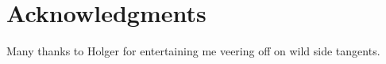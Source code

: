 \section*{Acknowledgments}
Many thanks to Holger for entertaining me veering off on wild side tangents.
